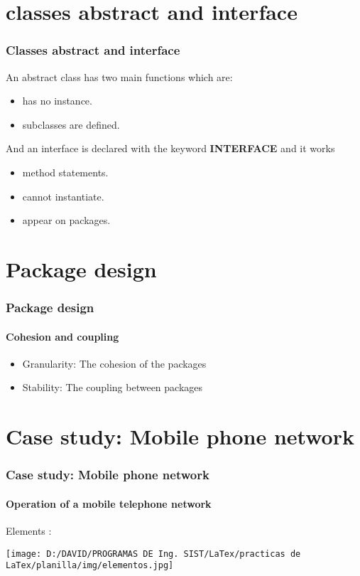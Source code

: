 \documentclass[11pt]{beamer}
\begin{document}
\section{classes abstract and interface}
\begin{frame}
\frametitle{Classes abstract and interface}
An abstract class has two main functions which are:\\
\begin {itemize}
  \item has no instance.
  \item subclasses are defined.
\end {itemize}  
And an interface is declared with the keyword \textbf{INTERFACE} and it works
\begin {itemize}
  \item method statements.
  \item cannot instantiate.
  \item appear on packages.
\end {itemize}

\end{frame}

\section{Package design}
\begin{frame}
\frametitle{Package design}
\framesubtitle{Cohesion and coupling}
\begin {itemize}
\item Granularity: The cohesion of the packages
\item Stability: The coupling between packages

\end{itemize}
\end{frame}

\section{Case study: Mobile phone network}
\begin{frame}
\frametitle{Case study: Mobile phone network}
\framesubtitle{Operation of a mobile telephone network}
 Elements : \\
 \begin{center}
\texttt{[image: D:/DAVID/PROGRAMAS DE Ing. SIST/LaTex/practicas de LaTex/planilla/img/elementos.jpg]} 
\end{center}
\end{frame}
\end{document}

